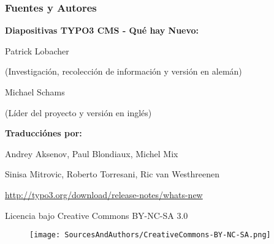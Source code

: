 \begin{frame}[fragile]
	\frametitle{Fuentes y Autores}

	\vspace{-0.6cm}

	\centerline{\textbf{Diapositivas TYPO3 CMS - Qué hay Nuevo:}}

	\begin{center}
		\smaller
			\centerline{Patrick Lobacher}
			\centerline{(Investigación, recolección de información y versión en alemán)}
			\vspace{0.1cm}
			\centerline{Michael Schams}
			\centerline{(Líder del proyecto y versión en inglés)}
		\normalsize
	\end{center}
	\vspace{-0.6cm}
	\begin{center}
		\smaller
			\centerline{\textbf{Traducciónes por:}}
			\centerline{Andrey Aksenov, Paul Blondiaux, Michel Mix}
			\centerline{Sinisa Mitrovic, Roberto Torresani, Ric van Westhreenen}
		\normalsize
	\end{center}
	\vspace{-0.6cm}
	\smaller\begin{center}\url{http://typo3.org/download/release-notes/whats-new}\end{center}\normalsize

	\smaller\begin{center}Licencia bajo Creative Commons BY-NC-SA 3.0\end{center}\normalsize
	\begin{figure}\vspace*{-0.3cm}
		\texttt{[image: SourcesAndAuthors/CreativeCommons-BY-NC-SA.png]}
	\end{figure}

\end{frame}

